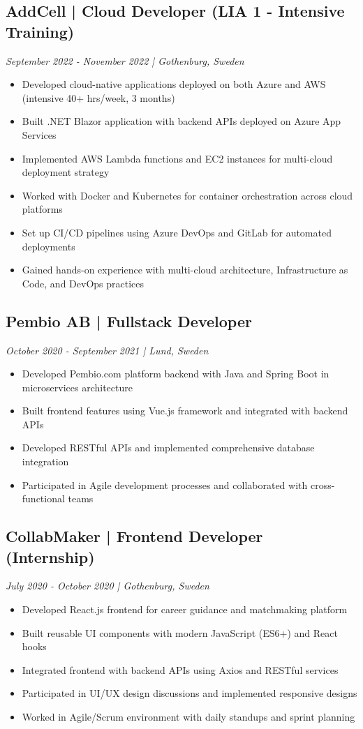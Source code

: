 \documentclass[11pt,a4paper]{article}
\begin{document}
\subsection*{AddCell | Cloud Developer (LIA 1 - Intensive Training)}
\textit{September 2022 - November 2022 | Gothenburg, Sweden}
\begin{itemize}[noitemsep]
\item Developed cloud-native applications deployed on both Azure and AWS (intensive 40+ hrs/week, 3 months)
\item Built .NET Blazor application with backend APIs deployed on Azure App Services
\item Implemented AWS Lambda functions and EC2 instances for multi-cloud deployment strategy
\item Worked with Docker and Kubernetes for container orchestration across cloud platforms
\item Set up CI/CD pipelines using Azure DevOps and GitLab for automated deployments
\item Gained hands-on experience with multi-cloud architecture, Infrastructure as Code, and DevOps practices
\end{itemize}

\subsection*{Pembio AB | Fullstack Developer}
\textit{October 2020 - September 2021 | Lund, Sweden}
\begin{itemize}[noitemsep]
\item Developed Pembio.com platform backend with Java and Spring Boot in microservices architecture
\item Built frontend features using Vue.js framework and integrated with backend APIs
\item Developed RESTful APIs and implemented comprehensive database integration
\item Participated in Agile development processes and collaborated with cross-functional teams
\end{itemize}

\subsection*{CollabMaker | Frontend Developer (Internship)}
\textit{July 2020 - October 2020 | Gothenburg, Sweden}
\begin{itemize}[noitemsep]
\item Developed React.js frontend for career guidance and matchmaking platform
\item Built reusable UI components with modern JavaScript (ES6+) and React hooks
\item Integrated frontend with backend APIs using Axios and RESTful services
\item Participated in UI/UX design discussions and implemented responsive designs
\item Worked in Agile/Scrum environment with daily standups and sprint planning
\end{itemize}
\end{document}
